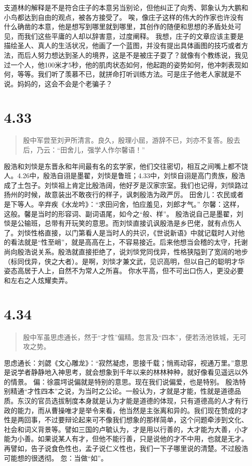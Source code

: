 \documentclass[]{book}
\begin{document}
支道林的解释是不是符合庄子的本意另当别论，但他纠正了向秀、郭象认为大鹏和小鸟都达到自由的观点，被各方接受了。
唉，像庄子这样的伟大的作家也许没有什么确凿的本意，他是想写到哪里就到哪里，其创作的随便和思想的矛盾处处可见，而我们这些平庸的人却以辞害意，过度阐释。
我想，庄子的文章应该主要是描绘圣人、真人的生活状况，他画了一个蓝图，并没有提出具体画图的技巧或者方法，而后人努力想达到圣人的境界，这是不是被庄子耍了？就像有个教练说，我见过一个人，他100米才5秒，他的肌肉状态如何，他起跑的姿势如何，他冲刺表现如何，等等。我们听了羡慕不已，就拼命打听训练方法。可是庄子他老人家就是不说。妈妈的，这会不会是个老骗子？

\section{4.33}\label{section-211}

\begin{quote}
殷中军尝至刘尹所清言。良久，殷理小屈，游辞不已，刘亦不复答。殷去后，乃云：``田舍儿，强学人作尔馨语！''
\end{quote}

殷浩和刘惔是东晋永和年间最有名的玄学家，他们交往密切，相互之间嘴上都不饶人。4.26中，殷浩自诩是墨翟，刘惔是鲁班；4.33中，刘惔自诩是高门贵族，殷浩成了土包子。刘惔祖上肯定比殷浩阔，他好歹是汉家宗室。我们也记得，刘惔路过扬州的时候，故意装出不敢夜行的样子，讽刺殷浩为政严厉。
田舍儿：农民或者是下等人。辛弃疾《水龙吟》：``求田问舍，怕应羞见，刘郎才气。''
尔馨：这样，这般。馨是当时的形容词、副词语尾，如今之``般、样''。
殷浩说自己是墨翟，刘惔是公输班，总带有开玩笑的意思。而刘惔直接讥讽殷浩是乡巴佬，就有点伤人了。刘惔性格直接，以门第看人是当时人的共识，《世说新语》中就记载时人对他的看法就是``性至峭''，就是高高在上，不容易接近。后来他想当会稽的太守，托谢尚向殷浩说关系。殷浩就直接拒绝了，说刘惔党同伐异，性格狭隘到了宽阔的地步（标同伐异，侠之大者）。是啊，刘惔才兼文武，见识高明，但以自己的聪明才华姿态高居于人上，自然不为常人之所喜。
你水平高，但不可出口伤人，更没必要和左右之人炫耀卖弄。

\section{4.34}\label{section-212}

\begin{quote}
殷中军虽思虑通长，然于``才性''偏精。忽言及``四本''，便若汤池铁城，无可攻之势。
\end{quote}

思虑通长：刘勰《文心雕龙》：``寂然凝虑，思接千载；悄焉动容，视通万里。''意思是说学者静静地入神思考，就会想象到千年以来的林林种种，就好像看见遥远以外的情景。
偏：徐震堮说偏就是特别的意思。现在我们说偏爱，也是特别。
殷浩特别精通``才性四本''之说，为当时之公论。一般认为，才就是才能，性就是道德品质。东汉的官员选拔制度本身就是认为才能是道德的体现，只有道德高的人才有行政的能力，而从曹操唯才是举令来看，他当然是主张离和异的。我们现在赞成的才性是两回事，不过要辩论起来可不像我们想象的那样简单，这个问题牵涉到文化、社会和词义背景等。譬如三国的卢毓认为，才是用以行善的，大才能为大善，小才能为小善。如果说某人有才，但他不能行善，只是说他的才不中用，也就是无才。再譬如，告子说食色性也，孟子说仁义性也，我们一下子哪里说的清楚。不过殷浩可能想的很透彻。
忽：当做``如''。
\end{document}
